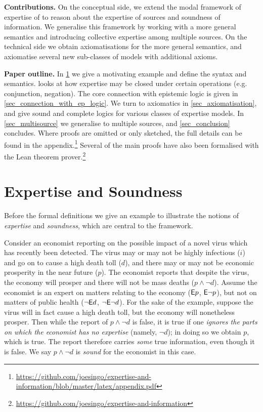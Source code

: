 \textbf{Contributions.} On the conceptual side, we extend the modal framework
of expertise of \citet{singleton2021logic} to reason about the expertise of
sources and soundness of information. We generalise this framework by working
with a more general semantics and introducing collective expertise among
multiple sources.
%
On the technical side we obtain axiomatisations for the more general semantics,
and axiomatise several new sub-classes of models with additional axioms.

\textbf{Paper outline.} In \cref{sec_expertise_and_soundness} we give a
motivating example and define the syntax and semantics.
 looks at how expertise may be closed under
certain operations (e.g. conjunction, negation). The core connection with
epistemic logic is given in \cref{sec_connection_with_ep_logic}. We turn to
axiomatics in \cref{sec_axiomatisation}, and give sound and complete logics for
various classes of expertise models. In \cref{sec_multisource} we generalise to
multiple sources, and \cref{sec_conclusion} concludes. Where proofs are omitted
or only sketched, the full details can be found in the
appendix.\footnote{\url{https://github.com/joesingo/expertise-and-information/blob/master/latex/appendix.pdf}}
Several of the main proofs have also been formalised with the Lean theorem
prover.\footnote{\url{https://github.com/joesingo/expertise-and-information}}

\section{Expertise and Soundness}
\label{sec_expertise_and_soundness}

Before the formal definitions we give an example to illustrate the notions of
\emph{expertise} and \emph{soundness}, which are central to the framework.

\begin{example}
    \label{ex_economist_motivation}

    Consider an economist reporting on the possible impact of a novel virus
    which has recently been detected. The virus may or may not be highly
    infectious ($i$) and go on to cause a high death toll ($d$), and there may
    or may not be economic prosperity in the near future ($p$). The economist
    reports that despite the virus, the economy will prosper and there will not
    be mass deaths ($p \land \neg d$). Assume the economist is an expert on
    matters relating to the economy ($\mathsf{E} p$, $\mathsf{E}\neg p$), but not on matters of
    public health ($\neg\mathsf{E} d$, $\neg\mathsf{E}\neg d$). For the sake of the example,
    suppose the virus will in fact cause a high death toll, but the economy
    will nonetheless prosper. Then while the report of $p \land \neg d$ is
    false, it is true if one \emph{ignores the parts on which the economist has
    no expertise} (namely, $\neg d$); in doing so we obtain $p$, which is true.
    The report therefore carries \emph{some} true information, even though it
    is false. We say $p \land \neg d$ is \emph{sound} for the economist in this
    case.

\end{example}

